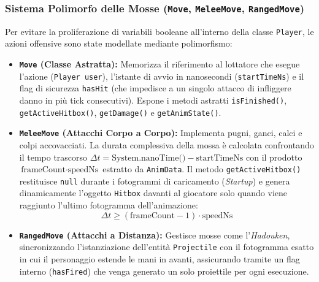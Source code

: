 \documentclass[11pt, a4paper]{article}
\begin{document}
\subsubsection{Sistema Polimorfo delle Mosse (\texttt{Move}, \texttt{MeleeMove}, \texttt{RangedMove})}
Per evitare la proliferazione di variabili booleane all'interno della classe \texttt{Player}, le azioni offensive sono state modellate mediante polimorfismo:
\begin{itemize}
    \item \textbf{\texttt{Move} (Classe Astratta):} Memorizza il riferimento al lottatore che esegue l'azione (\texttt{Player user}), l'istante di avvio in nanosecondi (\texttt{startTimeNs}) e il flag di sicurezza \texttt{hasHit} (che impedisce a un singolo attacco di infliggere danno in più tick consecutivi). Espone i metodi astratti \texttt{isFinished()}, \texttt{getActiveHitbox()}, \texttt{getDamage()} e \texttt{getAnimState()}.
    \item \textbf{\texttt{MeleeMove} (Attacchi Corpo a Corpo):} Implementa pugni, ganci, calci e colpi accovacciati. La durata complessiva della mossa è calcolata confrontando il tempo trascorso $\Delta t = \text{System.nanoTime()} - \text{startTimeNs}$ con il prodotto $\text{frameCount} \cdot \text{speedNs}$ estratto da \texttt{AnimData}. Il metodo \texttt{getActiveHitbox()} restituisce \texttt{null} durante i fotogrammi di caricamento (\emph{Startup}) e genera dinamicamente l'oggetto \texttt{Hitbox} davanti al giocatore solo quando viene raggiunto l'ultimo fotogramma dell'animazione:
    \begin{equation}
        \Delta t \ge (\text{frameCount} - 1) \cdot \text{speedNs}
    \end{equation}
    \item \textbf{\texttt{RangedMove} (Attacchi a Distanza):} Gestisce mosse come l'\emph{Hadouken}, sincronizzando l'istanziazione dell'entità \texttt{Projectile} con il fotogramma esatto in cui il personaggio estende le mani in avanti, assicurando tramite un flag interno (\texttt{hasFired}) che venga generato un solo proiettile per ogni esecuzione.
\end{itemize}
\end{document}
